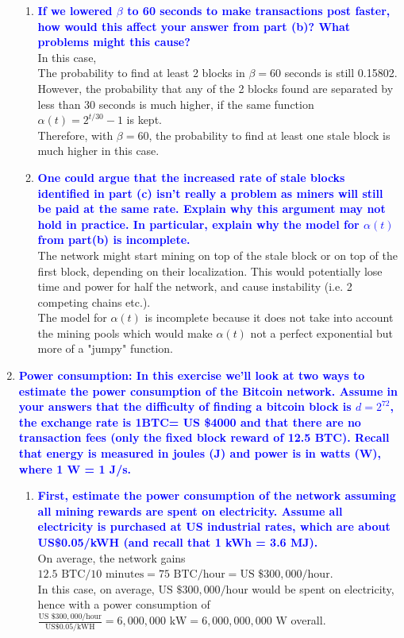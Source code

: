 \documentclass[11pt]{article}
\begin{document}
\begin{enumerate}
\begin{enumerate}
    \item \textbf{\textcolor{blue}{If we lowered $\beta$ to 60 seconds to make transactions post faster, how would this affect your answer from part (b)? What problems might this cause?}}
        \\ In this case, 
        \\ The probability to find at least 2 blocks in $\beta = 60$ seconds is still 0.15802.
        \\ However, the probability that any of the 2 blocks found are separated by less than 30 seconds is much higher, if the same function $\alpha(t) = 2^{t/30} - 1$ is kept.
        \\ Therefore, with $\beta = 60$, the probability to find at least one stale block is much higher in this case.
        
    \item \textbf{\textcolor{blue}{One could argue that the increased rate of stale blocks identified in part (c) isn't really a problem as miners will still be paid at the same rate. Explain why this argument may not hold in practice. In particular, explain why the model for $\alpha(t)$ from part(b) is incomplete.}}
        \\ The network might start mining on top of the stale block or on top of the first block, depending on their localization. This would potentially lose time and power for half the network, and cause instability (i.e. 2 competing chains etc.). 
        \\ The model for $\alpha(t)$ is incomplete because it does not take into account the mining pools which would make $\alpha(t)$ not a perfect exponential but more of a "jumpy" function. 
    \end{enumerate}

\item \textbf{\textcolor{blue}{Power consumption: In this exercise we'll look at two ways to estimate the power consumption of the Bitcoin network. Assume in your answers that the difficulty of finding a bitcoin block is $d = 2^{72}$, the exchange rate is 1BTC= US \$4000 and that there are no transaction fees (only the fixed block reward of 12.5 BTC). Recall that energy is measured in joules (J) and power is in watts (W), where 1 W = 1 J/s.}}
    \begin{enumerate}
    \item \textbf{\textcolor{blue}{First, estimate the power consumption of the network assuming all mining rewards are spent on electricity. Assume all electricity is purchased at US industrial rates, which are about US\$0.05/kWH (and recall that 1 kWh = 3.6 MJ).}}
        \\ On average, the network gains $12.5 \text{ BTC/10 minutes} = 75 \text{ BTC/hour} = \text{US } \$ 300,000 \text{/hour}$.
        \\ In this case, on average, $\text{US } \$ 300,000 \text{/hour}$ would be spent on electricity, hence with a power consumption of $\frac{\text{US } \$ 300,000 \text{/hour}}{\text{US} \$ 0.05 \text{/kWH}} = 6,000,000 \text{ kW} = 6,000,000,000 \text{ W}$ overall.
    

\end{enumerate}
\end{enumerate}
\end{document}
